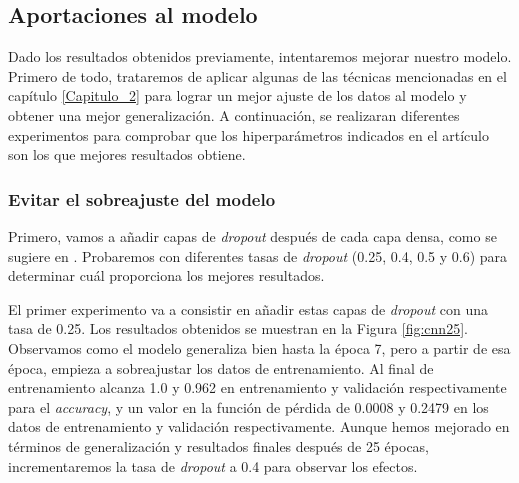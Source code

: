 \subsection{Aportaciones al modelo} \label{subsec:cnnmmc}

Dado los resultados obtenidos previamente, intentaremos mejorar nuestro modelo. Primero de todo, trataremos de aplicar algunas de las técnicas mencionadas en el capítulo \ref{Capitulo_2} para lograr un mejor ajuste de los datos al modelo y obtener una mejor generalización. A continuación, se realizaran diferentes experimentos para comprobar que los hiperparámetros indicados en el artículo \citep{kalash2018malware} son los que mejores resultados obtiene. 


\subsubsection*{Evitar el sobreajuste del modelo}

Primero, vamos a añadir capas de \textit{dropout} después de cada capa densa, como se sugiere en \citep{hinton2012improving, dileep2020dense}. Probaremos con diferentes tasas de \textit{dropout} (0.25, 0.4, 0.5 y 0.6) para determinar cuál proporciona los mejores resultados.

El primer experimento va a consistir en añadir estas capas de \textit{dropout} con una tasa de 0.25. Los resultados obtenidos se muestran en la Figura \ref{fig:cnn25}. Observamos como el modelo generaliza bien hasta la época 7, pero a partir de esa época, empieza a sobreajustar los datos de entrenamiento. Al final de entrenamiento alcanza 1.0 y 0.962 en entrenamiento y validación respectivamente para el  \textit{accuracy}, y un valor en la función de pérdida de 0.0008 y 0.2479 en los datos de entrenamiento y validación respectivamente. Aunque hemos mejorado en términos de generalización y resultados finales después de 25 épocas, incrementaremos la tasa de \textit{dropout} a 0.4 para observar los efectos.


